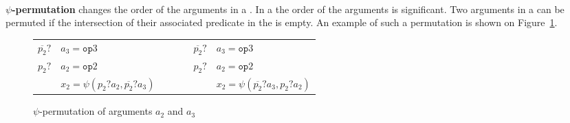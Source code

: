 ~\\
\textbf{$\psi$-permutation} changes the order of the
  arguments in a \psifun. In a \psifun the order of
  the arguments is significant. Two arguments in a \psifun can
  be permuted if the intersection of their associated predicate in the
  \psifun is empty. An example of such a permutation is shown
  on Figure~\ref{fig:psi_permutation}.

\begin{figure}[h]
\footnotesize
\hfill
\begin{tabular}{llp{3cm}ll}
${\overline{p_2}?}$ & ${a_3 = \texttt{op}3}$              & \ \ \ \  & ${\overline{p_2}?}$ & ${a_3 = \texttt{op}3}$ \\
${p_2?}$ & ${a_2 = \texttt{op}2}$             & \ \ \ \  & ${p_2?}$ & ${a_2 = \texttt{op}2}$ \\
             & ${x_2 = \psi(p_2?a_2, \overline{p_2}?a_3)}$ & \ \ \ \  &              &${x_2 = \psi(\overline{p_2}?a_3, p_2?a_2)}$ \\
\end{tabular}
\caption{$\psi$-permutation of arguments $a_2$ and $a_3$}
\label{fig:psi_permutation}
\end{figure}

